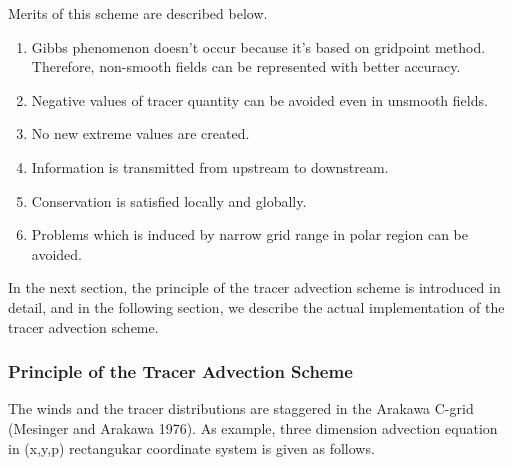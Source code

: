 Merits of this scheme are described below.
\begin{enumerate}
\item Gibbs phenomenon doesn't occur because it's based on gridpoint method. Therefore, non-smooth fields can be represented with better accuracy.
\item Negative values of tracer quantity can be avoided even in unsmooth fields.
\item No new extreme values are created.
\item Information is transmitted from upstream to downstream.
\item Conservation is satisfied locally and globally.
\item Problems which is induced by narrow grid range in polar region can be avoided.
\end{enumerate}
In the next section, the principle of the tracer advection scheme is introduced in detail, and in the following section, we describe the actual implementation of the tracer advection scheme.

\subsubsection{Principle of the Tracer Advection Scheme}
The winds and the tracer distributions are staggered in the Arakawa C-grid (Mesinger and Arakawa 1976).
As example, three dimension advection equation in (x,y,p) rectangukar coordinate system is given as follows.

